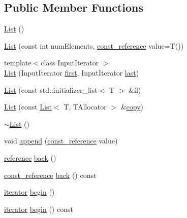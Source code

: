 \subsection*{Public Member Functions}
\begin{DoxyCompactItemize}
\item 
\hyperlink{classprism_1_1_list_a3608d1ce797df492ee7d90a3c340515f}{List} ()
\item 
\hyperlink{classprism_1_1_list_ae1f2cec1b8d7fecec86297fee77e499a}{List} (const int num\+Elements, \hyperlink{classprism_1_1_list_a31c013c3f9135c28c3c4bf489fbeb322}{const\+\_\+reference} value=T())
\item 
{\footnotesize template$<$class Input\+Iterator $>$ }\\\hyperlink{classprism_1_1_list_ae663f8e68894b024ce46a5e8d2c56d90}{List} (Input\+Iterator \hyperlink{classprism_1_1_list_a403997c37906888fb96e612557fc7a05}{first}, Input\+Iterator \hyperlink{classprism_1_1_list_a674a1f2acb2580b63ec54964334721dd}{last})
\item 
\hyperlink{classprism_1_1_list_a7d6096b7c959368bf0e35162959464d0}{List} (const std\+::initializer\+\_\+list$<$ T $>$ \&il)
\item 
\hyperlink{classprism_1_1_list_a043cd0e81a37f8c23e08673939fe8f91}{List} (const \hyperlink{classprism_1_1_list}{List}$<$ T, T\+Allocator $>$ \&\hyperlink{namespaceprism_ae776f4cd825f79e7af1cf6ee1d90a209}{copy})
\item 
\hyperlink{classprism_1_1_list_a5b1a463b75d19bf6fa6416783f8be842}{$\sim$\+List} ()
\item 
void \hyperlink{classprism_1_1_list_a52a0d0ad9f3d7008affbb33c59788973}{append} (\hyperlink{classprism_1_1_list_a31c013c3f9135c28c3c4bf489fbeb322}{const\+\_\+reference} value)
\item 
\hyperlink{classprism_1_1_list_a87113fe9cf2580e395e3d9f2962f4e81}{reference} \hyperlink{classprism_1_1_list_a17253058099ff3db0ff1c59ab9aaa062}{back} ()
\item 
\hyperlink{classprism_1_1_list_a31c013c3f9135c28c3c4bf489fbeb322}{const\+\_\+reference} \hyperlink{classprism_1_1_list_aa3f4adb4b98aaea022b44fc46dcedc39}{back} () const 
\item 
\hyperlink{classprism_1_1_list_aa95cb21a8754f91406f53bd0315513af}{iterator} \hyperlink{classprism_1_1_list_af79b38b4f00cd52875c043a236d8d5d1}{begin} ()
\item 
\hyperlink{classprism_1_1_list_aa95cb21a8754f91406f53bd0315513af}{iterator} \hyperlink{classprism_1_1_list_ac1c717e7a1cd1ab2b30ba0701158dad4}{begin} () const 

\end{DoxyCompactItemize}
